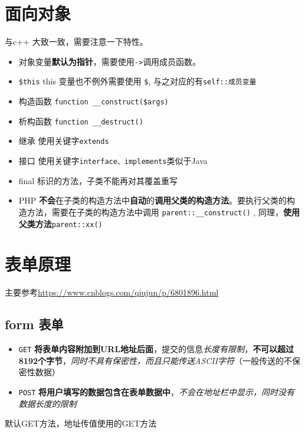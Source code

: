 \documentclass[UTF8,a4paper,12pt]{ctexbook}
\begin{document}
	\section{面向对象}
		与c++  大致一致，需要注意一下特性。
		\begin{itemize}
			\item 对象变量\textbf{默认为指针}，需要使用\verb|->|调用成员函数。
			\item \verb|$this| this 变量也不例外需要使用 \verb|$|, 与之对应的有\verb|self::成员变量 |
			\item 构造函数 \verb|function __construct($args)|
			\item 析构函数 \verb|function __destruct()|
			\item 继承 使用关键字\verb|extends |
			\item 接口 使用关键字\verb|interface、implements|类似于Java
			\item final 标识的方法，子类不能再对其覆盖重写
			\item PHP \textbf{不会}在子类的构造方法中\textbf{自动}的\textbf{调用父类的构造方法}。要执行父类的构造方法，需要在子类的构造方法中调用 \verb|parent::__construct()| , 同理，\textbf{使用父类方法}\verb|parent::xx()|
		\end{itemize}
		
	
	
	\section{表单原理}
		主要参考\url{https://www.cnblogs.com/qiujun/p/6801896.html}
		
		\subsection{form 表单}
			\begin{itemize}
				\item \verb|GET| \textbf{将表单内容附加到URL地址后面}，提交的信息\textit{长度有限制}，\textbf{不可以超过8192个字节}，\textit{同时不具有保密性，而且只能传送ASCII字符}（一般传送的不保密性数据）
				\item \verb|POST| \textbf{将用户填写的数据包含在表单数据中}，\textit{不会在地址栏中显示，同时没有数据长度的限制}
			\end{itemize}
			
			默认GET方法，地址传值使用的GET方法
			
\end{document}

